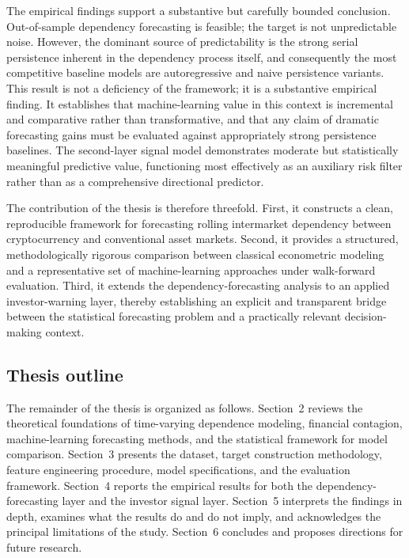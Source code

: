 The empirical findings support a substantive but carefully bounded conclusion. Out-of-sample dependency forecasting is feasible; the target is not unpredictable noise. However, the dominant source of predictability is the strong serial persistence inherent in the dependency process itself, and consequently the most competitive baseline models are autoregressive and naive persistence variants. This result is not a deficiency of the framework; it is a substantive empirical finding. It establishes that machine-learning value in this context is incremental and comparative rather than transformative, and that any claim of dramatic forecasting gains must be evaluated against appropriately strong persistence baselines. The second-layer signal model demonstrates moderate but statistically meaningful predictive value, functioning most effectively as an auxiliary risk filter rather than as a comprehensive directional predictor.

The contribution of the thesis is therefore threefold. First, it constructs a clean, reproducible framework for forecasting rolling intermarket dependency between cryptocurrency and conventional asset markets. Second, it provides a structured, methodologically rigorous comparison between classical econometric modeling and a representative set of machine-learning approaches under walk-forward evaluation. Third, it extends the dependency-forecasting analysis to an applied investor-warning layer, thereby establishing an explicit and transparent bridge between the statistical forecasting problem and a practically relevant decision-making context.

\subsection{Thesis outline}

The remainder of the thesis is organized as follows. Section~2 reviews the theoretical foundations of time-varying dependence modeling, financial contagion, machine-learning forecasting methods, and the statistical framework for model comparison. Section~3 presents the dataset, target construction methodology, feature engineering procedure, model specifications, and the evaluation framework. Section~4 reports the empirical results for both the dependency-forecasting layer and the investor signal layer. Section~5 interprets the findings in depth, examines what the results do and do not imply, and acknowledges the principal limitations of the study. Section~6 concludes and proposes directions for future research.
